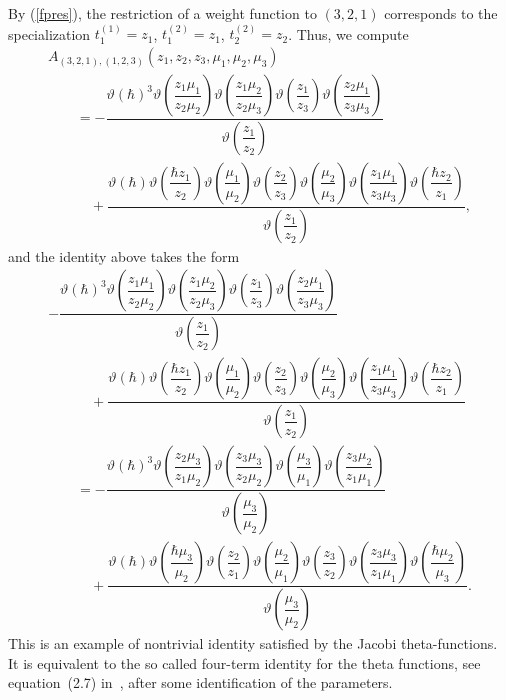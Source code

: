 \documentclass[10pt,a4paper]{amsart}
\let\thi\vartheta
\numberwithin{equation}{section}
\begin{document}
By (\ref{fpres}), the restriction of a weight function to $(3,2,1)$ corresponds to the specialization $t^{(1)}_1 =z_{{1}}$, $t^{(2)}_1 =z_{{1}}$, $t^{(2)}_2=z_{{2}}$. Thus, we compute
\begin{gather*}
A_{(3, 2, 1), (1, 2, 3)}(z_1,z_2,z_3,\mu_1,\mu_2,\mu_3) \\
\qquad{}= -\dfrac{\thi ( \hbar ) ^{3}\thi \left( {\dfrac {z
 _{{1}}\mu_{{1}}}{z_{{2}}\mu_{{2}}}} \right) \thi \left( {\dfrac {z_{{
 1}}\mu_{{2}}}{z_{{2}}\mu_{{3}}}} \right) \thi \left( {\dfrac {z_{{1}}
 }{z_{{3}}}} \right) \thi \left( {\dfrac {z_{{2}}\mu_{{1}}}{z_{{3}}\mu
 _{{3}}}} \right)}{\thi \left( {\dfrac {z_{{1}}}{z_{{2}}}} \right)} \\
 \qquad\quad{} +
 \dfrac{\thi( \hbar ) \thi \left( {
 \dfrac {\hbar z_{{1}}}{z_{{2}}}} \right) \thi \left( {\dfrac {\mu_{{1}}}{
 \mu_{{2}}}} \right) \thi \left( {\dfrac {z_{{2}}}{z_{{3}}}} \right)
 \thi \left( {\dfrac {\mu_{{2}}}{\mu_{{3}}}} \right) \thi \left( {
 \dfrac {z_{{1}}\mu_{{1}}}{z_{{3}}\mu_{{3}}}} \right) \thi \left( {
 \dfrac {\hbar z_{{2}}}{z_{{1}}}} \right)}{\thi \left( {\dfrac {z_{{1
 }}}{z_{{2}}}} \right)},
\end{gather*}
and the identity above takes the form
\begin{gather*}
-\dfrac{\thi ( \hbar ) ^{3} \thi \left( {\dfrac {z
 _{{1}}\mu_{{1}}}{z_{{2}}\mu_{{2}}}} \right) \thi \left( {\dfrac {z_{{
 1}}\mu_{{2}}}{z_{{2}}\mu_{{3}}}} \right) \thi \left( {\dfrac {z_{{1}}
 }{z_{{3}}}} \right) \thi \left( {\dfrac {z_{{2}}\mu_{{1}}}{z_{{3}}\mu
 _{{3}}}} \right) }{\thi \left( {\dfrac {z_{{1}}}{z_{{2}}}} \right)} \\
 \qquad\quad{} +
\dfrac{\thi( \hbar ) \thi \left( {
 \dfrac {\hbar z_{{1}}}{z_{{2}}}} \right) \thi \left( {\dfrac {\mu_{{1}}}{
 \mu_{{2}}}} \right) \thi \left( {\dfrac {z_{{2}}}{z_{{3}}}} \right)
 \thi \left( {\dfrac {\mu_{{2}}}{\mu_{{3}}}} \right) \thi \left( {
 \dfrac {z_{{1}}\mu_{{1}}}{z_{{3}}\mu_{{3}}}} \right) \thi \left( {
 \dfrac {\hbar z_{{2}}}{z_{{1}}}} \right) }{\thi \left( {\dfrac {z_{{1
 }}}{z_{{2}}}} \right)} \\
\qquad{}=
 - \dfrac{\thi(\hbar)^{3} \thi \left( {\dfrac {z
 _{{2}}\mu_{{3}}}{z_{{1}}\mu_{{2}}}} \right) \thi \left( {\dfrac {z_{{
 3}}\mu_{{3}}}{z_{{2}}\mu_{{2}}}} \right) \thi \left( {\dfrac {\mu_{{3
 }}}{\mu_{{1}}}} \right) \thi \left( {\dfrac {z_{{3}}\mu_{{2}}}{z_{{1}
 }\mu_{{1}}}} \right) }{ \thi \left( {\dfrac {\mu_{{3}}}{\mu_{{2}
 }}} \right) }\\
 \qquad\quad{} +\dfrac{\thi(\hbar) \thi \left( {
 \dfrac {\hbar\mu_{{3}}}{\mu_{{2}}}} \right) \thi \left( {\dfrac {z_{{2}}}{
 z_{{1}}}} \right) \thi \left( {\dfrac {\mu_{{2}}}{\mu_{{1}}}}
 \right) \thi \left( {\dfrac {z_{{3}}}{z_{{2}}}} \right) \thi
 \left( {\dfrac {z_{{3}}\mu_{{3}}}{z_{{1}}\mu_{{1}}}} \right) \thi
 \left( {\dfrac {\hbar \mu_{{2}}}{\mu_{{3}}}} \right) }{ \thi \left(
 {\dfrac {\mu_{{3}}}{\mu_{{2}}}} \right) } .
\end{gather*}
This is an example of nontrivial identity satisfied by the Jacobi theta-functions. It is equivalent to the so called four-term identity for the theta functions, see equation~(2.7) in~\cite{RTV}, after some identification of the parameters.
\end{document}
